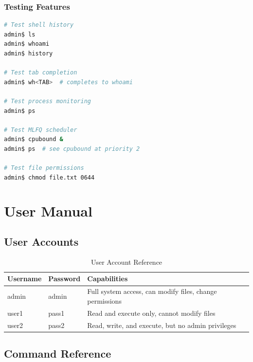 \documentclass[a4paper,12pt]{report}
\begin{document}
\subsection{Testing Features}

\begin{lstlisting}[language=bash, caption=Feature Testing]
# Test shell history
admin$ ls
admin$ whoami
admin$ history

# Test tab completion
admin$ wh<TAB>  # completes to whoami

# Test process monitoring
admin$ ps

# Test MLFQ scheduler
admin$ cpubound &
admin$ ps  # see cpubound at priority 2

# Test file permissions
admin$ chmod file.txt 0644
\end{lstlisting}

\chapter{User Manual}
\thispagestyle{contentpages}

\section{User Accounts}

\begin{table}[H]
\centering
\begin{tabular}{|l|l|p{7cm}|}
\hline
\textbf{Username} & \textbf{Password} & \textbf{Capabilities} \\
\hline
admin & admin & Full system access, can modify files, change permissions \\
user1 & pass1 & Read and execute only, cannot modify files \\
user2 & pass2 & Read, write, and execute, but no admin privileges \\
\hline
\end{tabular}
\caption{User Account Reference}
\label{tab:user_accounts}
\end{table}

\section{Command Reference}
\end{document}
